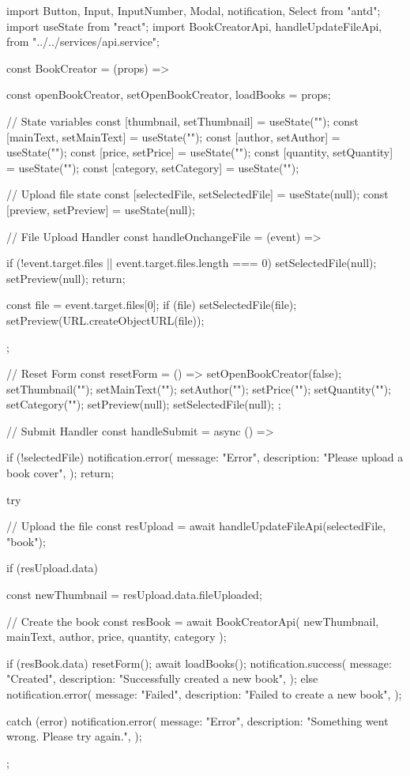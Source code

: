 import { Button, Input, InputNumber, Modal, notification, Select } from "antd";
import { useState } from "react";
import {
  BookCreatorApi,
  handleUpdateFileApi,
} from "../../services/api.service";

const BookCreator = (props) => {
  const { openBookCreator, setOpenBookCreator, loadBooks } = props;

  // State variables
  const [thumbnail, setThumbnail] = useState("");
  const [mainText, setMainText] = useState("");
  const [author, setAuthor] = useState("");
  const [price, setPrice] = useState("");
  const [quantity, setQuantity] = useState("");
  const [category, setCategory] = useState("");

  // Upload file state
  const [selectedFile, setSelectedFile] = useState(null);
  const [preview, setPreview] = useState(null);

  // File Upload Handler
  const handleOnchangeFile = (event) => {
    if (!event.target.files || event.target.files.length === 0) {
      setSelectedFile(null);
      setPreview(null);
      return;
    }

    const file = event.target.files[0];
    if (file) {
      setSelectedFile(file);
      setPreview(URL.createObjectURL(file));
    }
  };

  // Reset Form
  const resetForm = () => {
    setOpenBookCreator(false);
    setThumbnail("");
    setMainText("");
    setAuthor("");
    setPrice("");
    setQuantity("");
    setCategory("");
    setPreview(null);
    setSelectedFile(null);
  };

  // Submit Handler
  const handleSubmit = async () => {
    if (!selectedFile) {
      notification.error({
        message: "Error",
        description: "Please upload a book cover",
      });
      return;
    }

    try {
      // Upload the file
      const resUpload = await handleUpdateFileApi(selectedFile, "book");

      if (resUpload.data) {
        const newThumbnail = resUpload.data.fileUploaded;

        // Create the book
        const resBook = await BookCreatorApi(
          newThumbnail,
          mainText,
          author,
          price,
          quantity,
          category
        );

        if (resBook.data) {
          resetForm();
          await loadBooks();
          notification.success({
            message: "Created",
            description: "Successfully created a new book",
          });
        } else {
          notification.error({
            message: "Failed",
            description: "Failed to create a new book",
          });
        }
      }
    } catch (error) {
      notification.error({
        message: "Error",
        description: "Something went wrong. Please try again.",
      });
    }
  };

}
